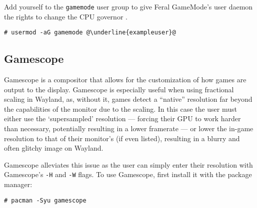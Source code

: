 \documentclass[a4paper]{article}
\begin{document}
Add yourself to the \lstinline|gamemode| user group to give Feral GameMode's user daemon the rights to change the CPU governor \cite{arch-wiki-gamemode}.
\begin{lstlisting}[escapechar=@]
# usermod -aG gamemode @\underline{exampleuser}@
\end{lstlisting}

\subsection{Gamescope}

Gamescope is a compositor that allows for the customization of how games are output to the display.
Gamescope is especially useful when using fractional scaling in Wayland, as, without it, games detect a ``native'' resolution far beyond the capabilities of the monitor due to the scaling.
In this case the user must either use the `supersampled' resolution --- forcing their GPU to work harder than necessary, potentially resulting in a lower framerate --- or lower the in-game resolution to that of their monitor's (if even listed), resulting in a blurry and often glitchy image on Wayland.

Gamescope alleviates this issue as the user can simply enter their resolution with Gamescope's \lstinline|-H| and \lstinline|-W| flags.
To use Gamescope, first install it with the package manager:
\begin{lstlisting}
# pacman -Syu gamescope
\end{lstlisting}
\end{document}
